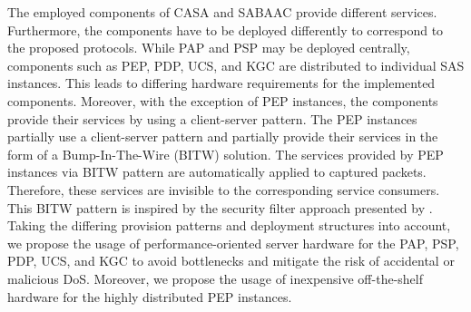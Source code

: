 The employed components of CASA and SABAAC provide different services.
Furthermore, the components have to be deployed differently to correspond to the proposed protocols.
While PAP and PSP may be deployed centrally, components such as PEP, PDP, UCS, and KGC are distributed to individual SAS instances.
This leads to differing hardware requirements for the implemented components.
Moreover, with the exception of PEP instances, the components provide their services by using a client-server pattern.
The PEP instances partially use a client-server pattern and partially provide their services in the form of a Bump-In-The-Wire (BITW) solution.
The services provided by PEP instances via BITW pattern are automatically applied to captured packets.
Therefore, these services are invisible to the corresponding service consumers.
This BITW pattern is inspired by the security filter approach presented by \citeauthor{Ishchenko2018} \cite{Ishchenko2018}.
Taking the differing provision patterns and deployment structures into account, we propose the usage of performance-oriented server hardware for the PAP, PSP, PDP, UCS, and KGC to avoid bottlenecks and mitigate the risk of accidental or malicious DoS.
Moreover, we propose the usage of inexpensive off-the-shelf hardware for the highly distributed PEP instances.
